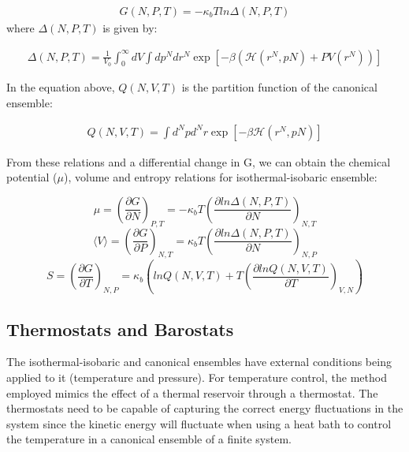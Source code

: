 \begin{equation}
\label{eq:fisobari}
\begin{aligned}
G(N,P,T) = -\kappa_{b}T ln \Delta (N,P,T)
\end{aligned}
\end{equation}
where $\Delta (N,P,T)$ is given by: 

\begin{equation}
\begin{aligned}
\Delta (N,P,T) = \frac{1}{V_{0}} \int_{0}^{\infty} dV \int d p^{N} d r^{N} \exp \left[ -\beta \left( \mathcal{H} (r^{N},p{N}) + PV(r^{N}) \right) \right]
\end{aligned}
\end{equation}

In the equation above, $Q (N,V,T)$ is the partition function of the canonical ensemble:

\begin{equation}
\begin{aligned}
Q(N,V,T) = \int d^{N}p d^{N}r \exp \left[ -\beta \mathcal{H} (r^{N},p{N})
\right]
\end{aligned}
\end{equation}

From these relations and a differential change in G, we can obtain the chemical potential ($\mu$), volume and entropy relations for isothermal-isobaric ensemble:

\begin{equation}
\mu = \left (\frac{\partial G}{\partial N} \right)_{P,T} = - \kappa_{b} T \left(\frac{\partial ln \Delta (N,P,T)}{\partial N} \right)_{N,T}
\end{equation}  
\begin{equation}
\langle V \rangle= \left (\frac{\partial G}{\partial P} \right)_{N,T}= \kappa_{b} T \left (\frac{\partial ln \Delta (N,P,T)}{\partial N} \right)_{N,P}
\end{equation}
\begin{equation}
S = \left (\frac{\partial G}{\partial T} \right)_{N,P}= \kappa_{b}  (ln Q(N,V,T)+ T \left (\frac{\partial ln Q (N,V,T)}{\partial T} \right)_{V,N})
\end{equation}

\subsection{Thermostats and Barostats}

The isothermal-isobaric and canonical ensembles have external conditions being applied to it (temperature and pressure). For temperature control, the method employed mimics the effect of a thermal reservoir through a thermostat. The thermostats need to be capable of capturing the correct energy fluctuations in the system since the kinetic energy will fluctuate when using a heat bath to control the temperature in a canonical ensemble of a finite system.  

